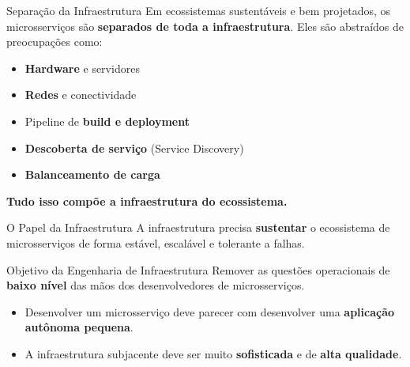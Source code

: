 \documentclass[aspectratio=169]{beamer}
\begin{document}
\begin{frame}{Separação da Infraestrutura}
    Em ecossistemas sustentáveis e bem projetados, os microsserviços são \textbf{separados de toda a infraestrutura}.
    \vspace{0.3cm}
    Eles são abstraídos de preocupações como:
    \begin{itemize}
        \item \textbf{Hardware} e servidores
        \item \textbf{Redes} e conectividade
        \item Pipeline de \textbf{build e deployment}
        \item \textbf{Descoberta de serviço} (Service Discovery)
        \item \textbf{Balanceamento de carga}
    \end{itemize}
    \vspace{0.3cm}
    \centering
    \textcolor{meuazul}{\textbf{Tudo isso compõe a infraestrutura do ecossistema.}}
\end{frame}

\begin{frame}{O Papel da Infraestrutura}
    A infraestrutura precisa \textbf{sustentar} o ecossistema de microsserviços de forma estável, escalável e tolerante a falhas.
    \vspace{0.3cm}
    \begin{block}{Objetivo da Engenharia de Infraestrutura}
        Remover as questões operacionais de \textbf{baixo nível} das mãos dos desenvolvedores de microsserviços.
    \end{block}
    \vspace{0.3cm}
    \begin{itemize}
        \item Desenvolver um microsserviço deve parecer com desenvolver uma \textbf{aplicação autônoma pequena}.
        \item A infraestrutura subjacente deve ser muito \textbf{sofisticada} e de \textbf{alta qualidade}.
    \end{itemize}
\end{frame}
\end{document}

